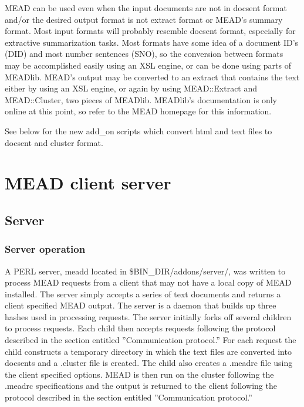 \documentclass[10pt]{article}
\begin{document}
MEAD can be used even when the input documents are not in 
docsent format and/or the desired output format is not 
extract format or MEAD's summary format.  Most input
formats will probably resemble docsent format, especially
for extractive summarization tasks.  Most formats have
some idea of a document ID's (DID) and most number sentences
(SNO), so the conversion between formats may be accomplished
easily using an XSL engine, or can be done using parts of
MEADlib.  MEAD's output may be converted to an extract
that contains the text either by using an XSL engine, or
again by using MEAD::Extract and MEAD::Cluster, two pieces
of MEADlib.  MEADlib's documentation is only online at this
point, so refer to the MEAD homepage for this information.

See below for the new add\_on scripts which convert
html and text files to docsent and cluster format.


\section{MEAD client server}

\subsection{Server}
\subsubsection{Server operation}
A PERL server, meadd located in \$BIN\_DIR/addons/server/, was written
to process MEAD requests from a client that may not have a local
copy of MEAD installed.  The server simply accepts a series of
text documents and returns a client specified MEAD output.  The
server is a daemon that builds up three hashes used in processing
requests.  The server initially forks off several children to
process requests.  Each child then accepts requests following the
protocol described in the section entitled ''Communication
protocol.''  For each request the child constructs a temporary
directory in which the text files are converted into docsents and
a .cluster file is created.  The child also creates a .meadrc
file using the client specified options.  MEAD is then run on the
cluster following the .meadrc specifications and the output is
returned to the client following the protocol described in the
section entitled ''Communication protocol.''
\end{document}
